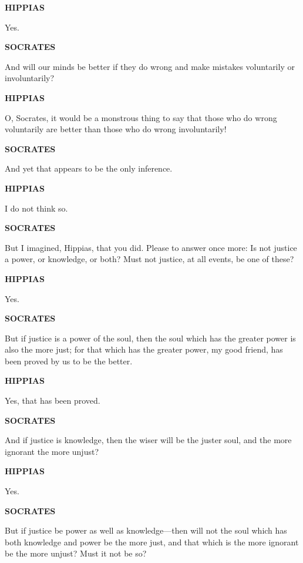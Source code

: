 \documentclass[11pt,letter]{article}
\begin{document}
\par \textbf{HIPPIAS}
\par   Yes.

\par \textbf{SOCRATES}
\par   And will our minds be better if they do wrong and make mistakes voluntarily or involuntarily?

\par \textbf{HIPPIAS}
\par   O, Socrates, it would be a monstrous thing to say that those who do wrong voluntarily are better than those who do wrong involuntarily!

\par \textbf{SOCRATES}
\par   And yet that appears to be the only inference.

\par \textbf{HIPPIAS}
\par   I do not think so.

\par \textbf{SOCRATES}
\par   But I imagined, Hippias, that you did. Please to answer once more:  Is not justice a power, or knowledge, or both? Must not justice, at all events, be one of these?

\par \textbf{HIPPIAS}
\par   Yes.

\par \textbf{SOCRATES}
\par   But if justice is a power of the soul, then the soul which has the greater power is also the more just; for that which has the greater power, my good friend, has been proved by us to be the better.

\par \textbf{HIPPIAS}
\par   Yes, that has been proved.

\par \textbf{SOCRATES}
\par   And if justice is knowledge, then the wiser will be the juster soul, and the more ignorant the more unjust?

\par \textbf{HIPPIAS}
\par   Yes.

\par \textbf{SOCRATES}
\par   But if justice be power as well as knowledge—then will not the soul which has both knowledge and power be the more just, and that which is the more ignorant be the more unjust? Must it not be so?
\end{document}
